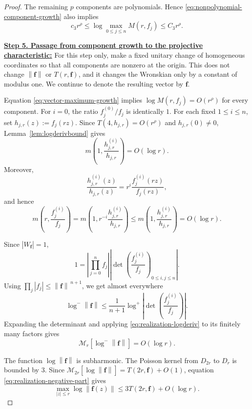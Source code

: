 \documentclass[12pt,letterpaper,reqno]{amsart}
\theoremstyle{definition}
\numberwithin{equation}{section}
\newcommand{\mean}[2]{\mathcal M_{#1}\!\left[#2\right]}
\newcommand{\norm}[1]{\left\lVert#1\right\rVert}
\newcommand{\fv}{\bm f}
\begin{document}
\begin{proof}
The remaining \(p\) components are polynomials. Hence
\eqref{eq:nonpolynomial-component-growth} also implies
\begin{equation}\label{eq:vector-maximum-growth}
 c_3r^\rho
 \leq
 \log\max_{0\leq j\leq n}M(r,f_j)
 \leq
 C_3r^\rho.
\end{equation}


\medskip\noindent
\textbf{\underline{Step 5. Passage from component growth to the projective characteristic:}}
For this step only, make a fixed unitary change of homogeneous
coordinates so that all components are nonzero at the origin. This
does not change \(\norm{\fv}\) or \(T(r,\fv)\), and it changes the
Wronskian only by a constant of modulus one. We continue to denote the
resulting vector by \(\fv\).

Equation \eqref{eq:vector-maximum-growth} implies
\(\log M(r,f_j)=O(r^\rho)\) for every component. For \(i=0\), the
ratio \(f_j^{(0)}/f_j\) is identically \(1\). For each fixed
\(1\leq i\leq n\), set \(h_{j,r}(z):=f_j(rz)\). Since
\(T(4,h_{j,r})=O(r^\rho)\) and \(h_{j,r}(0)\ne0\),
Lemma~\ref{lem:logderivbound} gives
\[
 m\left(1,\frac{h_{j,r}^{(i)}}{h_{j,r}}\right)=O(\log r).
\]
Moreover,
\[
\frac{h_{j,r}^{(i)}(z)}{h_{j,r}(z)}
=r^i\frac{f_j^{(i)}(rz)}{f_j(rz)},
\]
and hence
\begin{equation}\label{eq:realization-logderiv}
 m\left(r,\frac{f_j^{(i)}}{f_j}\right)
 =m\left(1,r^{-i}\frac{h_{j,r}^{(i)}}{h_{j,r}}\right)
 \le m\left(1,\frac{h_{j,r}^{(i)}}{h_{j,r}}\right)
 =O(\log r).
\end{equation}


Since \(|W_{\fv}|=1\),
\[
1
=
\left|\prod_{j=0}^{n}f_j\right|
\left|
\det
\left(
\frac{f_j^{(i)}}{f_j}
\right)_{0\leq i,j\leq n}
\right|.
\]
Using
\(\prod_j|f_j|\leq\norm{\fv}^{\,{n+1}}\), we get almost everywhere
\[
\log^-\norm{\fv}
\leq
\frac1{n+1}
\log^+
\left|
\det
\left(
\frac{f_j^{(i)}}{f_j}
\right)
\right|.
\]
Expanding the determinant and applying
\eqref{eq:realization-logderiv} to its finitely many factors gives
\begin{equation}\label{eq:realization-negative-part}
 \mean r{\log^-\norm{\fv}}
 =
 O(\log r).
\end{equation}

The function \(\log\norm{\fv}\) is subharmonic. The Poisson kernel
from \(D_{2r}\) to \(D_r\) is bounded by \(3\). Since
\(\mean{2r}{\log\norm{\fv}}
 =T(2r,\fv)+O(1)\), equation
\eqref{eq:realization-negative-part} gives
\begin{equation}\label{eq:realization-poisson}
 \max_{|z|\leq r}\log\norm{\fv(z)}
 \leq
 3T(2r,\fv)+O(\log r).
\end{equation}


\end{proof}
\end{document}
